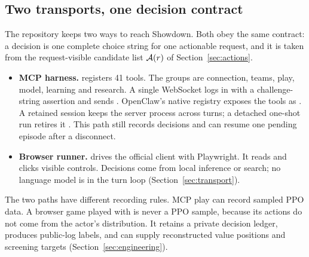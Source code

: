 \subsection{Two transports, one decision contract}
The repository keeps two ways to reach Showdown. Both obey the same contract:
a decision is one complete choice string for one actionable request, and it is
taken from the request-visible candidate list $\mathcal{A}(r)$ of
Section~\ref{sec:actions}.
\begin{itemize}
  \item \textbf{MCP harness.}  registers 41 tools.
    The groups are connection, teams, play, model, learning and research. A
    single  WebSocket logs in with a challenge-string
    assertion and sends 
    \citep{mcptools,mcptransport,showdownprotocol}. OpenClaw's native registry
    exposes the tools as . A retained session keeps
    the server process across turns; a detached one-shot run retires it
    \citep{openclawregistry}. This path still records decisions and can resume
    one pending episode after a disconnect.
  \item \textbf{Browser runner.}  drives the
    official client with Playwright. It reads  and clicks
    visible controls. Decisions come from local inference or search; no
    language model is in the turn loop (Section~\ref{sec:transport}).
\end{itemize}
The two paths have different recording rules. MCP play can record sampled PPO
data. A browser game played with  is never a PPO sample,
because its actions do not come from the actor's distribution. It retains a
private decision ledger, produces public-log labels, and can supply reconstructed
value positions and screening targets (Section~\ref{sec:engineering}).


